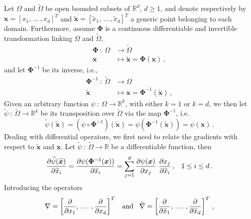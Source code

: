 \documentclass[12pt, a4paper, twoside, openright, notitlepage]{report}
\numberwithin{equation}{chapter}
\theoremstyle{theorem}
\theoremstyle{definition}
\theoremstyle{remark}
\theoremstyle{proposition}
\numberwithin{figure}{chapter}
\newcommand{\wt}[1]{\widetilde{#1}}
\newcommand{\bg}[1]{\boldsymbol{#1}}
\begin{document}
		Let $\Omega$ and $\wt{\Omega}$ be open bounded subsets of $\mathbb{R}^d$, $d \geq 1$, and denote respectively by \\ $\bg{x} = [x_1, \, \ldots \, , x_d]^T$ and $\wt{\bg{x}} = [\wt{x}_1, \, \ldots \, , \wt{x}_d]^T$ a generic point belonging to each domain. Furthermore, assume $\bg{\Phi}$ is a continuous differentiable and invertible transformation linking $\Omega$ and $\wt{\Omega}$,
		\begin{equation*}
			\begin{aligned}
				\bg{\Phi} ~ : ~ \Omega & \rightarrow \wt{\Omega} \\
				\bg{x} & \mapsto \wt{\bg{x}} = \bg{\Phi}(\bg{x}) \, , 
			\end{aligned}
		\end{equation*}
		and let $\bg{\Phi}^{-1}$ be its inverse, i.e.,
		\begin{equation*}
			\begin{aligned}
				\bg{\Phi}^{-1} ~ : ~ \wt{\Omega} & \rightarrow \Omega \\
				\wt{\bg{x}} & \mapsto \bg{x} = \bg{\Phi}^{-1}(\wt{\bg{x}}) \, , 
			\end{aligned}
		\end{equation*}
		Given an arbitrary function $\psi ~ : ~ \Omega \rightarrow \mathbb{R}^k$, with either $k = 1$ or $k = d$, we then let $\wt{\psi} ~ : ~ \wt{\Omega} \rightarrow \mathbb{R}^k$ be its transposition over $\wt{\Omega}$ via the map $\bg{\Phi}^{-1}$, i.e.
		\begin{equation*}
			\wt{\psi}(\wt{\bg{x}}) = (\psi \circ \bg{\Phi}^{-1})(\wt{\bg{x}}) = \psi(\bg{\Phi}^{-1}(\wt{\bg{x}})) = \psi(\bg{x}) \, .
		\end{equation*}
		Dealing with differential operators, we first need to relate the gradients with respect to $\wt{\bg{x}}$ and $\bg{x}$. Let $\wt{\psi} ~ : ~ \wt{\Omega} \rightarrow \mathbb{R}$ be a differentiable function, then
		\begin{equation}
			\label{eq:chain-rule-component}
			\dfrac{\partial \wt{\psi}(\wt{\bg{x}})}{\partial \wt{x}_i} = \dfrac{\partial \psi(\bg{\Phi}^{-1}(\bg{x}))}{\partial \wt{x}_i} = \sum_{j = 1}^d \dfrac{\partial \psi(\bg{x})}{\partial x_j} ~ \dfrac{\partial x_j}{\partial \wt{x}_i} \, , \hspace*{0.3cm} 1 \leq i \leq d \, .
		\end{equation}  
		Introducing the operators
		\begin{equation*}
			\nabla = \left[ \dfrac{\partial}{\partial x_1}, \, \ldots \, , \dfrac{\partial}{\partial x_d} \right]^T \hspace*{0.3cm} \text{and} \hspace*{0.3cm} \wt{\nabla} = \left[ \dfrac{\partial}{\partial \wt{x}_1}, \, \ldots \, , \dfrac{\partial}{\partial \wt{x}_d} \right]^T \, ,
		\end{equation*}
\end{document}
